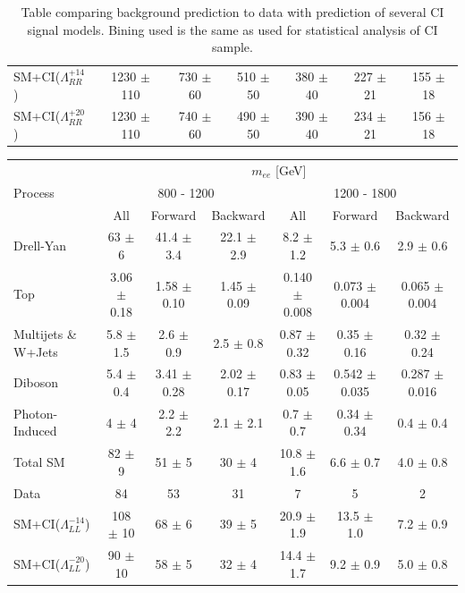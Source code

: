 \begin {table}[h]
\begin{center}
\begin{tabular}{  l | c c c | c c c  }
			SM+CI($\Lambda^{+14}_{RR}$) & 1230 $\pm$ 110 & 730 $\pm$ 60 & 510 $\pm$ 50 & 380 $\pm$ 40 & 227 $\pm$ 21 & 155 $\pm$ 18 \\
			SM+CI($\Lambda^{+20}_{RR}$) & 1230 $\pm$ 110 & 740 $\pm$ 60 & 490 $\pm$ 50 & 390 $\pm$ 40 & 234 $\pm$ 21 & 156 $\pm$ 18 \\
			\hline
		\end{tabular}
		\label{tab:CI_results1}
	  	\caption{Table comparing background prediction to data with prediction of several CI signal models. Bining used is the same as used for statistical analysis of CI sample.}
	  	\end{center}
	\end {table}

	\begin {table}[h]
		\footnotesize 
		\begin{center}
		\begin{tabular}{  l | c c c | c c c  }	
			\hline
			\hline
			\multirow{3}{*}{Process} 	& \multicolumn{6}{c}{$m_{ee}$ [GeV]} \\
										& \multicolumn{3}{c}{800 - 1200} & \multicolumn{3}{c}{1200 - 1800} \\
										\cline{2-7}
										& All & Forward & Backward & All & Forward & Backward \\
			\hline
			Drell-Yan & 63 $\pm$ 6 & 41.4 $\pm$ 3.4 & 22.1 $\pm$ 2.9 & 8.2 $\pm$ 1.2 & 5.3 $\pm$ 0.6 & 2.9 $\pm$ 0.6 \\
			Top & 3.06 $\pm$ 0.18 & 1.58 $\pm$ 0.10 & 1.45 $\pm$ 0.09 & 0.140 $\pm$ 0.008 & 0.073 $\pm$ 0.004 & 0.065 $\pm$ 0.004 \\
			Multijets \& W+Jets & 5.8 $\pm$ 1.5 & 2.6 $\pm$ 0.9 & 2.5 $\pm$ 0.8 & 0.87 $\pm$ 0.32 & 0.35 $\pm$ 0.16 & 0.32 $\pm$ 0.24 \\
			Diboson & 5.4 $\pm$ 0.4 & 3.41 $\pm$ 0.28 & 2.02 $\pm$ 0.17 & 0.83 $\pm$ 0.05 & 0.542 $\pm$ 0.035 & 0.287 $\pm$ 0.016 \\
			Photon-Induced & 4 $\pm$ 4 & 2.2 $\pm$ 2.2 & 2.1 $\pm$ 2.1 & 0.7 $\pm$ 0.7 & 0.34 $\pm$ 0.34 & 0.4 $\pm$ 0.4 \\
			\hline
			Total SM & 82 $\pm$ 9 & 51 $\pm$ 5 & 30 $\pm$ 4 & 10.8 $\pm$ 1.6 & 6.6 $\pm$ 0.7 & 4.0 $\pm$ 0.8 \\
			\hline
			Data & 84 & 53 & 31 & 7 & 5 & 2 \\
			\hline
			SM+CI($\Lambda^{-14}_{LL}$) & 108 $\pm$ 10 & 68 $\pm$ 6 & 39 $\pm$ 5 & 20.9 $\pm$ 1.9 & 13.5 $\pm$ 1.0 & 7.2 $\pm$ 0.9 \\
			SM+CI($\Lambda^{-20}_{LL}$) & 90 $\pm$ 10 & 58 $\pm$ 5 & 32 $\pm$ 4 & 14.4 $\pm$ 1.7 & 9.2 $\pm$ 0.9 & 5.0 $\pm$ 0.8 \\

\end{tabular}
\end{center}
\end{table}
